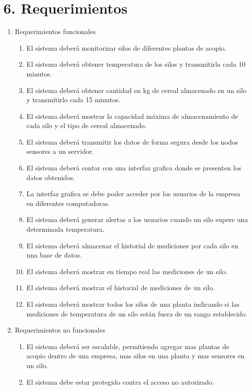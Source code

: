 \documentclass[
11pt, %
]{charter}
\begin{document}
\section{6. Requerimientos}
\label{sec:requerimientos}

\begin{enumerate}
	\item Requerimientos funcionales
		\begin{enumerate}
			\item El sistema deberá monitorizar silos de diferentes plantas de acopio.
			\item El sistema deberá obtener temperatura de los silos y transmitirla cada 10 minutos.
			\item El sistema deberá obtener cantidad en kg de cereal almacenado en un silo y transmitirlo cada 15 minutos.
			\item El sistema deberá mostrar la capacidad máxima de almacenamiento de cada silo y el tipo de cereal almacenado.
			\item El sistema deberá transmitir los datos de forma segura desde los nodos sensores a un servidor. 
			\item El sistema deberá contar con una interfaz grafica donde se presenten los datos obtenidos.
			\item La interfaz grafica se debe poder acceder por los usuarios de la empresa en diferentes computadoras.
			\item El sistema deberá generar alertas a los usuarios cuando un silo supere una determinada temperatura. 
			\item El sistema deberá almacenar el historial de mediciones por cada silo en una base de datos. 
			\item El sistema deberá mostrar en tiempo real las mediciones de un silo. 
			\item El sistema deberá mostrar el historial de mediciones de un silo.
			\item El sistema deberá mostrar todos los silos de una planta indicando si las mediciones de temperatura de un silo están fuera de un rango establecido. 
		\end{enumerate}
	\item Requerimientos no funcionales
		\begin{enumerate}
			\item El sistema deberá ser escalable, permitiendo agregar mas plantas de acopio dentro de una empresa, mas silos en una planta y mas sensores en un silo.  
			\item El sistema debe estar protegido contra el acceso no autorizado.

\end{enumerate}
\end{enumerate}
\end{document}
